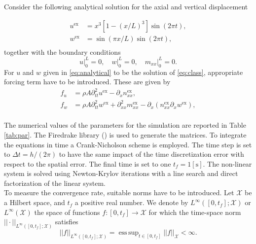 \documentclass{ifacconf}
\DeclareMathOperator*{\esssup}{ess\,sup}
\begin{document}
Consider the following analytical solution for the axial and vertical displacement

\begin{equation}\label{eq:analytical}
	\begin{aligned}
		u^{\text{ex}} &= x^3[1-(x/L)^3] \sin(2 \pi t), \\
		w^{\text{ex}} &= \sin(\pi x/L)\sin(2 \pi t), \\
	\end{aligned}
\end{equation}
together with the boundary conditions
\begin{equation}
u\vert_0^L = 0, \quad w\vert_0^L =0, \quad m_{xx}\vert_{0}^L=0.
\end{equation}
For $u$ and $w$ given in \eqref{eq:analytical} to be the solution of \eqref{eq:class}, appropriate forcing term have to be introduced. These are given by 
\begin{equation}\label{eq:forcing}
	\begin{aligned}
		f_u &= \rho A \partial_{tt}^2 u^{\text{ex}} - \partial_x n_{xx}^{\text{ex}}, \\
		f_w &= \rho A \partial_{tt}^2 w^{\text{ex}} + \partial_{xx}^2 m_{xx}^{\text{ex}} - \partial_x(n_{xx}^{\text{ex}} \partial_x w^{\text{ex}}), \\
	\end{aligned}
\end{equation}

The numerical values of the parameters for the simulation are reported in Table \ref{tab:par}. The Firedrake library (\cite{rathgeber2017firedrake}) is used to generate the matrices. To integrate the equations in time a Crank-Nicholson scheme is employed. The time step is set to $\Delta t = h/(2 \pi)$ to have the same impact of the time discretization error with respect to the spatial error. The final time is set to one $t_f = 1 [\textrm{s}]$. The non-linear system is solved using Newton-Krylov iterations with a line search and direct factorization of the linear system.  \\

To measure the convergence rate,  suitable norms have to be introduced. 
Let $\mathcal{X}$ be a Hilbert space, and $t_f$ a positive real number. We denote by $L^\infty([0, t_f]; \mathcal{X})$ or $L^\infty(\mathcal{X})$ the space of functions $f: [0, t_f] \rightarrow \mathcal{X}$ for which the time-space norm $||\cdot||_{L^\infty([0, t_f]; \mathcal{X})}$ satisfies
\[
||f||_{L^\infty([0, t_f]; \mathcal{X})} = \esssup_{t \in [0,t_f]} ||f||_{\mathcal{X}} < \infty.
\]
\end{document}
